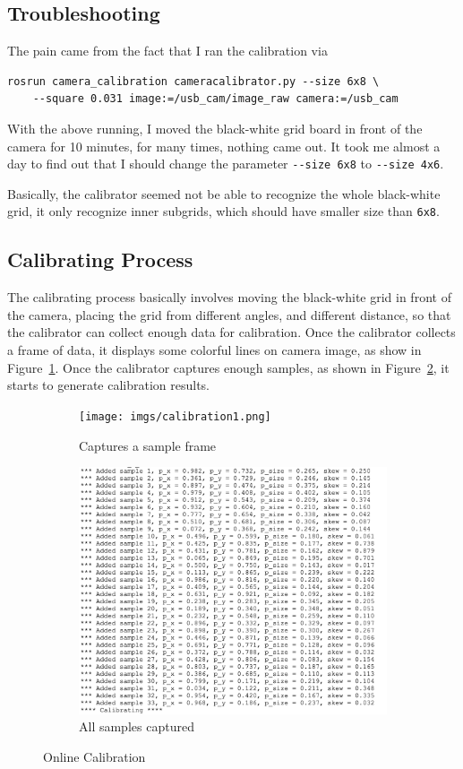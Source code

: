 \documentclass[11pt, oneside]{article}   	%
\begin{document}
\subsection{Troubleshooting}
The pain came from the fact that I ran the calibration via 
\begin{verbatim}
rosrun camera_calibration cameracalibrator.py --size 6x8 \
    --square 0.031 image:=/usb_cam/image_raw camera:=/usb_cam
\end{verbatim}

With the above running, I moved the black-white grid board in front of the camera for 10 minutes, for many times, nothing came out. It took me almost a day to find out that I should change the parameter \verb+--size 6x8+ to \verb+--size 4x6+. 

Basically, the calibrator seemed not be able to recognize the whole black-white grid, it only recognize inner subgrids, which should have smaller size than \verb+6x8+.

\subsection{Calibrating Process}
The calibrating process basically involves moving the black-white grid in front of the camera, placing the grid from different angles, and different distance, so that the calibrator can collect enough data for calibration. Once the calibrator collects a frame of data, it displays some colorful lines on camera image, as show in Figure~\ref{fig.2.a}. Once the calibrator captures enough samples, as shown in Figure~\ref{fig.2.b}, it starts to generate calibration results.

\begin{figure}[ht]
\centering
\begin{subfigure}[b]{0.4\textwidth}
\texttt{[image: imgs/calibration1.png]}
\caption{Captures a sample frame}
\label{fig.2.a}
\end{subfigure}
\begin{subfigure}[b]{0.455\textwidth}
\includegraphics[width=\textwidth]{imgs/calibration2.png}
\caption{All samples captured }
\label{fig.2.b}
\end{subfigure}
\caption{Online Calibration}
\label{fig.2}
\end{figure}
\end{document}
